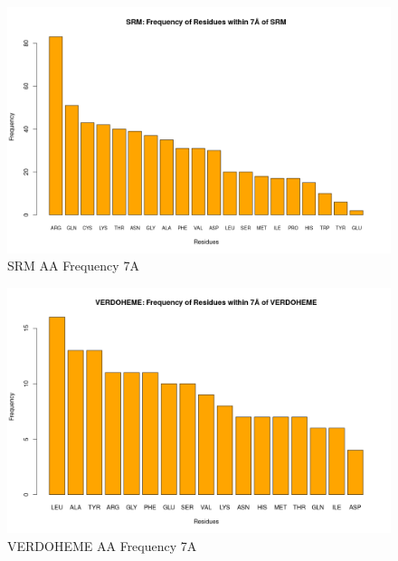 	\begin{figure}
		\caption{SRM AA Frequency 7A}
		\label{figs:SRM_aafreq7}
		\includegraphics[width=1.0\textwidth]{7A/SRM_aaFreq}
	\end{figure}
	
	\begin{figure}
		\caption{VERDOHEME AA Frequency 7A}
		\label{figs:VERDOHEME_aafreq7}
		\includegraphics[width=1.0\textwidth]{7A/VERDOHEME_aaFreq}
	\end{figure}



		
